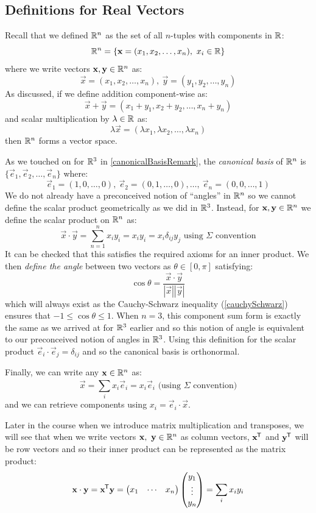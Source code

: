 \documentclass[../main.tex]{subfiles}
\begin{document}
\subsection{Definitions for Real Vectors}
Recall that we defined $\mathbb{R}^{n}$ as the set of all $n$-tuples with components in $\mathbb{R}$:
\[
  \R^{n} = \{\vec{x} = (x_1, x_2, \ldots, x_n),\ x_i \in \R\}
\]
where we write vectors $\mathbf{\bm{x}}, \mathbf{\bm{y}} \in \mathbb{R}^{n}$ as:
\[
  \vec{x} = (x_1, x_2, \ldots, x_n),\ \vec{y} = (y_1, y_2, \ldots, y_n)
\]
As discussed, if we define addition component-wise as:
\[
  \vec{x} + \vec{y} = (x_1 + y_1, x_2 + y_2, \ldots, x_n + y_n)
\]
and scalar multiplication by $\lambda \in \mathbb{R}$ as:
\[
  \lambda \vec{x} = (\lambda x_1, \lambda x_2, \ldots, \lambda x_n)
\]
then $\mathbb{R}^{n}$ forms a vector space.

As we touched on for $\mathbb{R}^3$ in \cref{canonicalBasisRemark}, the \textit{canonical basis} of $\mathbb{R}^{n}$ is $\{\vec{e}_1, \vec{e}_2, \ldots, \vec{e}_n\}$ where:
\[
  \vec{e}_1 = (1, 0, \ldots, 0),\ \vec{e}_2 = (0, 1, \ldots, 0), \ldots,\ \vec{e}_n = (0, 0, \ldots, 1)
\]
We do not already have a preconceived notion of ``angles'' in $\mathbb{R}^{n}$ so we cannot define the scalar product geometrically as we did in $\mathbb{R}^{3}$.
Instead, for $\mathbf{\bm{x}}, \mathbf{\bm{y}} \in \mathbb{R}^{n}$ we define the scalar product on $\mathbb{R}^{n}$ as:
\[
  \vec{x} \cdot \vec{y} = \sum_{n = 1}^{n} x_i y_i = x_iy_i = x_i \delta_{i j} y_j \text{ using $\Sigma$ convention}
\]
It can be checked that this satisfies the required axioms for an inner product.
We then \textit{define the angle} between two vectors as $\theta \in [0, \pi]$ satisfying:
\[
  \cos \theta = \frac{\vec{x} \cdot \vec{y}}{|\vec{x}||\vec{y}|}
\]
which will always exist as the Cauchy-Schwarz inequality (\cref{cauchySchwarz}) ensures that $-1 \leq \cos \theta \leq 1$.
When $n = 3$, this component sum form is exactly the same as we arrived at for $\mathbb{R}^3$ earlier and so this notion of angle is equivalent to our preconceived notion of angles in $\mathbb{R}^3$.
Using this definition for the scalar product $\vec{e}_i \cdot \vec{e}_j = \delta_{i j}$ and so the canonical basis is orthonormal.

Finally, we can write any $\mathbf{\bm{x}} \in \mathbb{R}^{n}$ as:
\[
  \vec{x} = \sum_{i}^{} x_i \vec{e}_i = x_i \vec{e}_i \text{ (using $\Sigma$ convention)}
\]
and we can retrieve components using $x_i = \vec{e}_i \cdot \vec{x}$.
\begin{remark}[Note]
  Later in the course when we introduce matrix multiplication and transposes, we will see that when we write vectors $\mathbf{\bm{x}},\ \mathbf{\bm{y}} \in \mathbb{R}^{n}$ as column vectors, $\mathbf{\bm{x}}^{{\mkern-1.5mu\mathsf{T}}}$ and $\mathbf{\bm{y}}^{{\mkern-1.5mu\mathsf{T}}}$ will be row vectors and so their inner product can be represented as the matrix product:
  \[
    \mathbf{\bm{x}} \cdot \mathbf{\bm{y}} = \mathbf{\bm{x}}^{{\mkern-1.5mu\mathsf{T}}} \mathbf{\bm{y}} =
    \begin{pmatrix}
    x_1 & \cdots & x_n \\
    \end{pmatrix}
    \begin{pmatrix}
    y_1 \\
    \vdots \\
    y_n \\
    \end{pmatrix}
    = \sum_{i}^{} x_i y_i
  \]
\end{remark}
\end{document}

